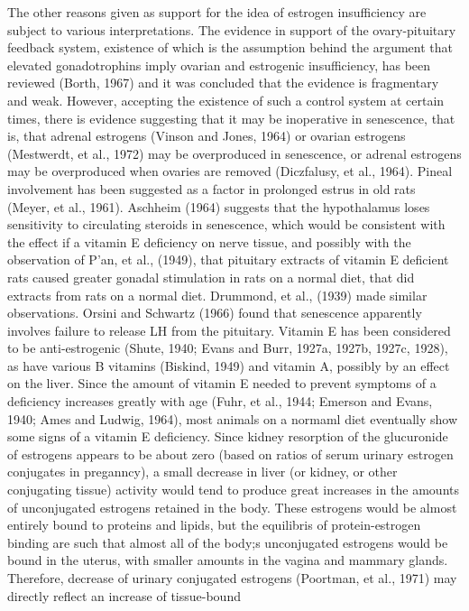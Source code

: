 The other reasons given as support for the idea of estrogen insufficiency are subject to various interpretations. The evidence in support of the ovary-pituitary feedback system, existence of which is the assumption behind the argument that elevated gonadotrophins imply ovarian and estrogenic insufficiency, has
been reviewed (Borth, 1967) and it was concluded that the evidence is fragmentary and weak. However, accepting the existence of such a control system at certain times, there is evidence suggesting that it may be inoperative in senescence, that is, that adrenal
estrogens (Vinson and Jones, 1964) or ovarian estrogens (Mestwerdt, et al., 1972) may be overproduced in senescence, or adrenal estrogens may be overproduced when ovaries are removed (Diczfalusy, et al., 1964). Pineal involvement has been suggested as a factor in prolonged
estrus in old rats (Meyer, et al., 1961). Aschheim (1964) suggests that the hypothalamus loses sensitivity to circulating steroids in senescence, which would be consistent with the effect if a vitamin E deficiency on nerve tissue, and possibly with the observation of P'an, et al., (1949), that
pituitary extracts of vitamin E deficient rats caused greater gonadal stimulation in rats on a normal diet, that did extracts from rats on a normal diet. Drummond, et al., (1939) made similar observations. Orsini and Schwartz (1966) found that senescence apparently involves failure
to release LH from the pituitary. Vitamin E has been considered to be anti-estrogenic (Shute, 1940; Evans and Burr, 1927a, 1927b, 1927c, 1928), as have various B vitamins (Biskind, 1949) and vitamin A, possibly by an effect on the liver. Since the amount of vitamin E needed to prevent symptoms
of a deficiency increases greatly with age (Fuhr, et al., 1944; Emerson and Evans, 1940; Ames and Ludwig, 1964), most animals on a normaml diet eventually show some signs of a vitamin E deficiency. Since kidney resorption of the glucuronide of estrogens appears to be about zero (based on ratios of
serum urinary estrogen conjugates in preganncy), a small decrease in liver (or kidney, or other conjugating tissue) activity would tend to produce great increases in the amounts of unconjugated estrogens retained in the body. These estrogens would be almost entirely bound to proteins and lipids, but the
equilibris of protein-estrogen binding are such that almost all of the body;s unconjugated estrogens would be bound in the uterus, with smaller amounts in the vagina and mammary glands. Therefore, decrease of urinary conjugated estrogens (Poortman, et al., 1971) may directly reflect an increase of tissue-bound
